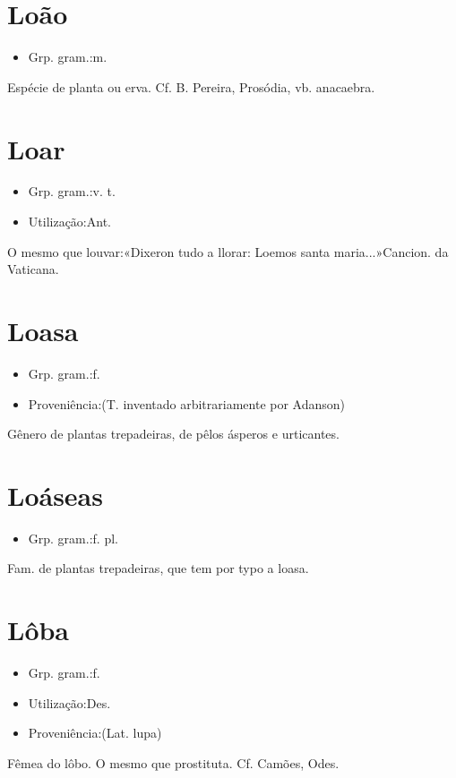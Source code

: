 \section{Loão}
\begin{itemize}
\item {Grp. gram.:m.}
\end{itemize}
Espécie de planta ou erva. Cf. B. Pereira, \textunderscore Prosódia\textunderscore , vb. \textunderscore anacaebra\textunderscore .
\section{Loar}
\begin{itemize}
\item {Grp. gram.:v. t.}
\end{itemize}
\begin{itemize}
\item {Utilização:Ant.}
\end{itemize}
O mesmo que \textunderscore louvar\textunderscore :«\textunderscore Dixeron tudo a llorar: Loemos santa maria...\textunderscore »\textunderscore Cancion. da Vaticana\textunderscore .
\section{Loasa}
\begin{itemize}
\item {Grp. gram.:f.}
\end{itemize}
\begin{itemize}
\item {Proveniência:(T. inventado arbitrariamente por Adanson)}
\end{itemize}
Gênero de plantas trepadeiras, de pêlos ásperos e urticantes.
\section{Loáseas}
\begin{itemize}
\item {Grp. gram.:f. pl.}
\end{itemize}
Fam. de plantas trepadeiras, que tem por typo a \textunderscore loasa\textunderscore .
\section{Lôba}
\begin{itemize}
\item {Grp. gram.:f.}
\end{itemize}
\begin{itemize}
\item {Utilização:Des.}
\end{itemize}
\begin{itemize}
\item {Proveniência:(Lat. \textunderscore lupa\textunderscore )}
\end{itemize}
Fêmea do lôbo.
O mesmo que \textunderscore prostituta\textunderscore . Cf. Camões, \textunderscore Odes\textunderscore .
